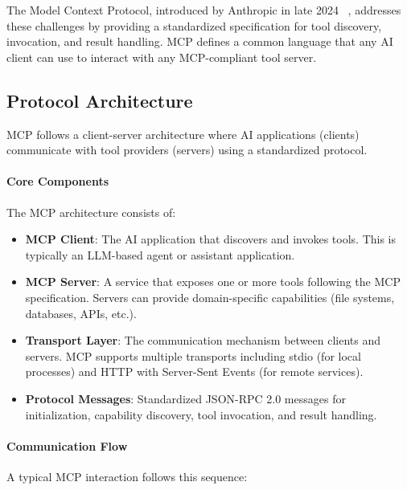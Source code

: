 The Model Context Protocol, introduced by Anthropic in late 2024~%
, addresses these challenges by providing a standardized specification for tool discovery, invocation, and result handling. MCP defines a common language that any AI client can use to interact with any MCP-compliant tool server.

\subsection{Protocol Architecture}

MCP follows a client-server architecture where AI applications (clients) communicate with tool providers (servers) using a standardized protocol.

\paragraph{Core Components}

The MCP architecture consists of:

\begin{itemize}
    \item \textbf{MCP Client}: The AI application that discovers and invokes tools. This is typically an LLM-based agent or assistant application.
    
    \item \textbf{MCP Server}: A service that exposes one or more tools following the MCP specification. Servers can provide domain-specific capabilities (file systems, databases, APIs, etc.).
    
    \item \textbf{Transport Layer}: The communication mechanism between clients and servers. MCP supports multiple transports including stdio (for local processes) and HTTP with Server-Sent Events (for remote services).
    
    \item \textbf{Protocol Messages}: Standardized JSON-RPC 2.0 messages for initialization, capability discovery, tool invocation, and result handling.
\end{itemize}

\paragraph{Communication Flow}

A typical MCP interaction follows this sequence:

